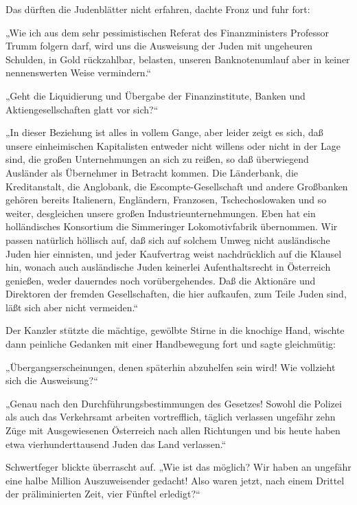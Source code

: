 Das dürften die Judenblätter nicht erfahren, dachte Fronz und fuhr
fort:

„Wie ich aus dem sehr pessimistischen Referat des Finanzministers
Professor Trumm folgern darf, wird uns die Ausweisung der Juden mit
ungeheuren Schulden, in Gold rückzahlbar, belasten, unseren
Banknotenumlauf aber in keiner nennenswerten Weise vermindern.“

„Geht die Liquidierung und Übergabe der Finanzinstitute, Banken
und Aktiengesellschaften glatt vor sich?“

„In dieser Beziehung ist alles in vollem Gange, aber leider zeigt
es sich, daß unsere einheimischen Kapitalisten entweder nicht
willens oder nicht in der Lage sind, die großen Unternehmungen an
sich zu reißen, so daß überwiegend Ausländer als Übernehmer in
Betracht kommen. Die Länderbank, die Kreditanstalt, die Anglobank,
die Escompte-Gesellschaft und andere Großbanken gehören bereits
Italienern, Engländern, Franzosen, Tschechoslowaken und so weiter,
desgleichen unsere großen Industrieunternehmungen. Eben hat ein
holländisches Konsortium die Simmeringer Lokomotivfabrik
übernommen. Wir passen natürlich höllisch auf, daß sich auf solchem
Umweg nicht ausländische Juden hier einnisten, und jeder
Kaufvertrag weist nachdrücklich auf die Klausel hin, wonach auch
ausländische Juden keinerlei Aufenthaltsrecht in Österreich
genießen, weder dauerndes noch vorübergehendes. Daß 
die Aktionäre und Direktoren der fremden Gesellschaften, die hier
aufkaufen, zum Teile Juden sind, läßt sich aber nicht vermeiden.“

Der Kanzler stützte die mächtige, gewölbte Stirne in die knochige
Hand, wischte dann peinliche Gedanken mit einer Handbewegung fort
und sagte gleichmütig:

„Übergangserscheinungen, denen späterhin abzuhelfen sein wird! Wie
vollzieht sich die Ausweisung?“

„Genau nach den Durchführungsbestimmungen des Gesetzes! Sowohl die
Polizei als auch das Verkehrsamt arbeiten vortrefflich, täglich
verlassen ungefähr zehn Züge mit Ausgewiesenen Österreich nach
allen Richtungen und bis heute haben etwa vierhunderttausend Juden
das Land verlassen.“

Schwertfeger blickte überrascht auf. „Wie ist das möglich? Wir
haben an ungefähr eine halbe Million Auszuweisender gedacht! Also
waren jetzt, nach einem Drittel der präliminierten Zeit, vier
Fünftel erledigt?“

